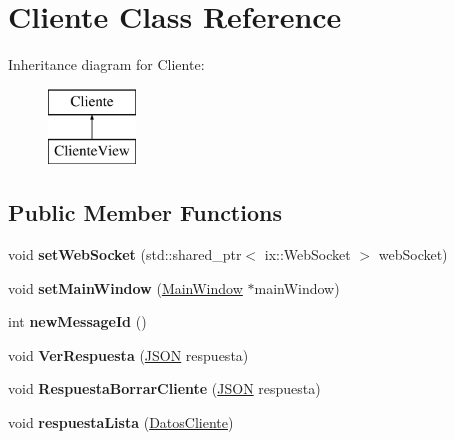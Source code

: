 \hypertarget{classCliente}{}\section{Cliente Class Reference}
\label{classCliente}
Inheritance diagram for Cliente\+:\begin{figure}[H]
\begin{center}
\leavevmode
\includegraphics[height=2.000000cm]{classCliente}
\end{center}
\end{figure}
\subsection*{Public Member Functions}
\begin{DoxyCompactItemize}
\item 
\mbox{\label{classCliente_ac0a99cb961dc4a842b88df8810e9bbcf}} 
void {\bfseries set\+Web\+Socket} (std\+::shared\+\_\+ptr$<$ ix\+::\+Web\+Socket $>$ web\+Socket)
\item 
\mbox{\label{classCliente_a48fea4eaf979c44741fa7104a29385e7}} 
void {\bfseries set\+Main\+Window} (\mbox{\hyperlink{classMainWindow}{Main\+Window}} $\ast$main\+Window)
\item 
\mbox{\label{classCliente_addca42ad4fc158cbe1fd51d206a0523f}} 
int {\bfseries new\+Message\+Id} ()
\item 
\mbox{\label{classCliente_aad40988f336462348748f7a5745b1a8c}} 
void {\bfseries Ver\+Respuesta} (\mbox{\hyperlink{cliente_8cpp_ab6104b89642419db4e355b7b2e40abbe}{J\+S\+ON}} respuesta)
\item 
\mbox{\label{classCliente_a3ba6a63f946a5d89d286c55721b32fb6}} 
void {\bfseries Respuesta\+Borrar\+Cliente} (\mbox{\hyperlink{cliente_8cpp_ab6104b89642419db4e355b7b2e40abbe}{J\+S\+ON}} respuesta)
\item 
\mbox{\label{classCliente_aa6e1db9ce56d9ba3395df66819439893}} 
void {\bfseries respuesta\+Lista} (\mbox{\hyperlink{structDatosCliente}{Datos\+Cliente}})
\end{DoxyCompactItemize}

